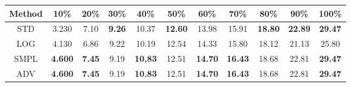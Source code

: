 \documentclass{standalone}
\begin{document}
\begin{tabular}{c|cccccccccc}
      \toprule
      Method & 10\% & 20\% & 30\% & 40\% & 50\% & 60\% & 70\% & 80\% & 90\% & 100\% \\
      \midrule
STD & 3.230 & 7.10 & \textbf{9.26} & 10.37 & \textbf{12.60} & 13.98 & 15.91 & \textbf{18.80} & \textbf{22.89} & \textbf{29.47}\\
LOG & 4.130 & 6.86 & 9.22 & 10.19 & 12.54 & 14.33 & 15.80 & 18.12 & 21.13 & 25.80\\
SMPL & \textbf{4.600} & \textbf{7.45} & 9.19 & \textbf{10.83} & 12.51 & \textbf{14.70} & \textbf{16.43} & 18.68 & 22.81 & \textbf{29.47}\\
ADV & \textbf{4.600} & \textbf{7.45} & 9.19 & \textbf{10.83} & 12.51 & \textbf{14.70} & \textbf{16.43} & 18.68 & 22.81 & \textbf{29.47}\\
  \bottomrule
\end{tabular}
\end{document}
